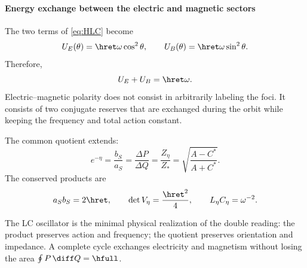 \paragraph{Energy exchange between the electric and magnetic sectors}

The two terms of \eqref{eq:HLC} become
\begin{equation}
U_E(\theta)=\hret\omega\cos^2\theta,
\qquad
U_B(\theta)=\hret\omega\sin^2\theta.
\label{eq:energy-exchange}
\end{equation}
Therefore,
\[
U_E+U_B=\hret\omega.
\]
Electric--magnetic polarity does not consist in arbitrarily labeling
the foci. It consists of two conjugate reserves that are exchanged during the
orbit while keeping the frequency and total action constant.

The common quotient extends:
\begin{equation}
\boxed{
e^{-\eta}
=\frac{b_S}{a_S}
=\frac{\Delta P}{\Delta Q}
=\frac{Z_\eta}{Z_*}
=\sqrt{\frac{A-C^*}{A+C^*}}.}
\label{eq:shape-chain-LC}
\end{equation}
The conserved products are
\[
a_Sb_S=2\hret,\qquad
\det V_\eta=\frac{\hret^2}{4},
\qquad
L_\eta C_\eta=\omega^{-2}.
\]

\begin{exactbox}
The LC oscillator is the minimal physical realization of the double reading: the
product preserves action and frequency; the quotient preserves orientation and
impedance. A complete cycle exchanges electricity and magnetism without
losing the area \(\oint P\,\diff Q=\hfull\).
\end{exactbox}

